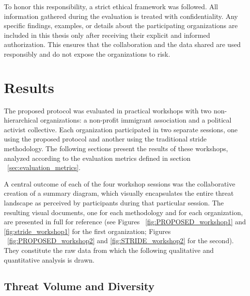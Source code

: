 To honor this responsibility, a strict ethical framework was followed. All
information gathered during the evaluation is treated with
confidentiality. Any specific findings, examples, or details about the
participating organizations are included in this thesis only after receiving
their explicit and informed authorization. This ensures that the collaboration
and the data shared are used responsibly and do not expose the organizations to
risk.

\section{Results}
\label{sec:results}

The proposed protocol was evaluated in practical workshops with two non-hierarchical
organizations: a non-profit immigrant association and a political activist collective.
Each organization participated in two separate sessions, one using the
proposed protocol and another using the traditional \gls{stride} methodology.
The following sections present the results of these workshops, analyzed according to the
evaluation metrics defined in section ~\ref{sec:evaluation_metrics}.

A central outcome of each of the four workshop sessions was the collaborative
creation of a summary diagram, which visually encapsulates the entire threat
landscape as perceived by participants during that particular session. The
resulting visual documents, one for each methodology and for each organization,
are presented in full for reference (see Figures ~\ref{fig:PROPOSED_workshop1}
and \ref{fig:stride_workshop1} for the first organization; Figures
~\ref{fig:PROPOSED_workshop2} and \ref{fig:STRIDE_workshop2} for the second).
They constitute the raw data from which the following qualitative and
quantitative analysis is drawn.

\subsection{Threat Volume and Diversity}
\label{subsec:threat_volumediversity}




